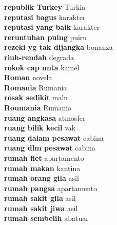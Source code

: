 \textbf{ republik Turkey  } Turkia \\
\textbf{ reputasi bagus  } karakter \\
\textbf{ reputasi yang baik  } karakter \\
\textbf{ reruntuhan puing  } puiru \\
\textbf{ rezeki yg tak dijangka  } bonanza \\
\textbf{ riuh-rendah  } degrada \\
\textbf{ rokok cap unta  } kamel \\
\textbf{ Roman  } novela \\
\textbf{ Romania  } Rumania \\
\textbf{ rosak sedikit  } malu \\
\textbf{ Roumania  } Rumania \\
\textbf{ ruang angkasa  } atmosfer \\
\textbf{ ruang bilik kecil  } vak \\
\textbf{ ruang dalam pesawat  } cabina \\
\textbf{ ruang dlm pesawat  } cabina \\
\textbf{ rumah flet  } apartamento \\
\textbf{ rumah makan  } kantina \\
\textbf{ rumah orang gila  } asil \\
\textbf{ rumah pangsa  } apartamento \\
\textbf{ rumah sakit gila  } asil \\
\textbf{ rumah sakit jiwa  } asil \\
\textbf{ rumah sembelih  } abatuar \\
